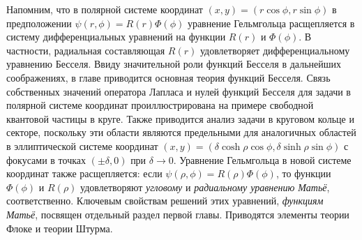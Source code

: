 Напомним, что в полярной системе координат $(x,y) = (r \cos \phi, r \sin \phi)$ в предположении $\psi(r, \phi) = R(r) \Phi(\phi)$ уравнение Гельмгольца расщепляется в систему дифференциальных уравнений на функции $R(r)$ и $\Phi(\phi)$. В частности, радиальная составляющая $R(r)$ удовлетворяет дифференциальному уравнению Бесселя. 
Ввиду значительной роли функций Бесселя в дальнейших соображениях, в главе приводится основная теория функций Бесселя.
Связь собственных значений оператора Лапласа и нулей функций Бесселя для задачи в полярной системе координат проиллюстрирована на примере свободной квантовой частицы в круге. 
Также приводится анализ задачи в круговом кольце и секторе, поскольку эти области являются предельными для аналогичных областей в эллиптической системе координат $(x,y)=(\delta \cosh \rho \cos \phi, \delta \sinh \rho \sin \phi)$ с фокусами в точках $(\pm \delta,0)$ при $\delta \to 0$.
Уравнение Гельмгольца в новой системе координат также расщепляется: если $\psi(\rho, \phi) = R(\rho) \Phi(\phi)$, то функции $\Phi(\phi)$ и $R(\rho)$ удовлетворяют \textit{угловому} и \textit{радиальному уравнению Матьё}, соответственно.
Ключевым свойствам решений этих уравнений, \textit{функциям Матьё}, посвящен отдельный раздел первой главы. 
Приводятся элементы теории Флоке и теории Штурма. 
